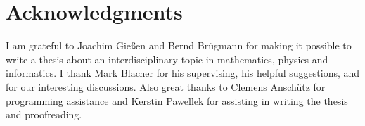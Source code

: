 \documentclass[crop=false]{standalone}
\begin{document}


  \section*{Acknowledgments}
  \thispagestyle{empty}
  I am grateful to Joachim Gießen and Bernd Brügmann for making it possible to write a thesis about an interdisciplinary topic in mathematics, physics and informatics.
  I thank Mark Blacher for his supervising, his helpful suggestions, and for our interesting discussions.
  Also great thanks to Clemens Anschütz for programming assistance and Kerstin Pawellek for assisting in writing the thesis and proofreading.
  \restoregeometry
\end{document}
